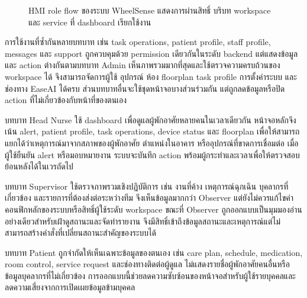 \begin{figure}[!htbp]
{}
    \caption{HMI role flow ของระบบ WheelSense แสดงการผ่านสิทธิ์ บริบท workspace และ service ที่ dashboard เรียกใช้งาน}
    \label{fig:ch3_hmi_role_flow}
\end{figure}
\FloatBarrier

การใช้งานที่ซ้ำกันหลายบทบาท เช่น task operations, patient profile, staff profile, messages และ support ถูกควบคุมด้วย permission เดียวกันในระดับ backend แต่แสดงข้อมูลและ action ต่างกันตามบทบาท Admin เห็นภาพรวมมากที่สุดและใช้ตรวจความครบถ้วนของ workspace ได้ จึงสามารถจัดการผู้ใช้ อุปกรณ์ ห้อง floorplan task profile การตั้งค่าระบบ และช่องทาง EaseAI ได้ครบ ส่วนบทบาทอื่นจะใช้ชุดหน้าจอบางส่วนร่วมกัน แต่ถูกลดข้อมูลหรือปิด action ที่ไม่เกี่ยวข้องกับหน้าที่ของตนเอง

บทบาท Head Nurse ใช้ dashboard เพื่อดูแลผู้พักอาศัยหลายคนในเวลาเดียวกัน หน้าจอหลักจึงเน้น alert, patient profile, task operations, device status และ floorplan เพื่อให้สามารถแยกได้ว่าเหตุการณ์มาจากสภาพของผู้พักอาศัย ตำแหน่งในอาคาร หรืออุปกรณ์ที่ขาดการเชื่อมต่อ เมื่อผู้ใช้ยืนยัน alert หรือมอบหมายงาน ระบบจะบันทึก action พร้อมผู้กระทำและเวลาเพื่อให้ตรวจสอบย้อนหลังได้ในเวรถัดไป

บทบาท Supervisor ใช้ตรวจภาพรวมเชิงปฏิบัติการ เช่น งานที่ค้าง เหตุการณ์ฉุกเฉิน บุคลากรที่เกี่ยวข้อง และรายการที่ต้องส่งต่อระหว่างทีม จึงเห็นข้อมูลมากกว่า Observer แต่ยังไม่ควรแก้ไขค่าคอนฟิกหลักของระบบหรือสิทธิ์ผู้ใช้ระดับ workspace ขณะที่ Observer ถูกออกแบบเป็นมุมมองอ่านอย่างเดียวสำหรับเฝ้าดูสถานะและจัดทำรายงาน จึงมีสิทธิ์เข้าถึงข้อมูลสถานะและเหตุการณ์แต่ไม่สามารถสร้างคำสั่งที่เปลี่ยนสถานะสำคัญของระบบได้

บทบาท Patient ถูกจำกัดให้เห็นเฉพาะข้อมูลของตนเอง เช่น care plan, schedule, medication, room control, service request และช่องทางติดต่อผู้ดูแล ไม่แสดงรายชื่อผู้พักอาศัยคนอื่นหรือข้อมูลบุคลากรที่ไม่เกี่ยวข้อง การออกแบบนี้ช่วยลดความซับซ้อนของหน้าจอสำหรับผู้ใช้รายบุคคลและลดความเสี่ยงจากการเปิดเผยข้อมูลข้ามบุคคล

